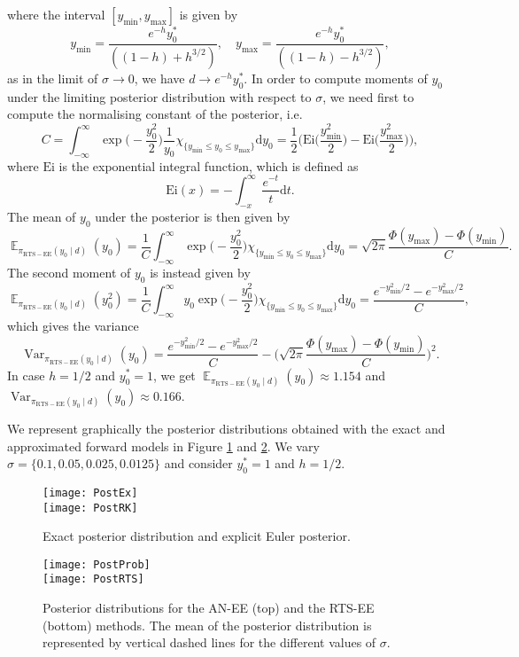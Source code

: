 \documentclass{siamart1116}
\numberwithin{theorem}{section}
\newcommand{\Var}{\operatorname{Var}}
\newcommand{\E}{\operatorname{\mathbb{E}}}
\newcommand{\dd}{\mathrm{d}}
\begin{document}
where the interval $[y_{\min}, y_{\max}]$ is given by
\[
	y_{\min} = \frac{e^{-h}y_0^*}{((1 - h) + h^{3/2})}, \quad y_{\max} = \frac{e^{-h}y_0^*}{((1 - h) - h^{3/2})},
\]
as in the limit of $\sigma \to 0$, we have $d \to e^{-h}y_0^*$. In order to compute moments of $y_0$ under the limiting posterior distribution with respect to $\sigma$, we need first to compute the normalising constant of the posterior, i.e.
\[
	C = \int_{-\infty}^{\infty} \exp\Big(-\frac{y_0^2}{2}\Big)\frac{1}{y_0} \chi_{\{y_{\min} \leq y_0 \leq y_{\max}\}} \dd y_0 = \frac{1}{2}\Big(\mathrm{Ei}\big(\frac{y_{\min}^2}{2}\big) - \mathrm{Ei}\big(\frac{y_{\max}^2}{2}\big)\Big),
\]
where $\mathrm{Ei}$ is the exponential integral function, which is defined as
\[
	\mathrm{Ei}(x) = - \int_{-x}^{\infty} \frac{e^{-t}}{t} \dd t.
\]
The mean of $y_0$ under the posterior is then given by
\[
	\E_{\pi_{\mathrm{RTS-EE}}(y_0 \mid d)} (y_0) = \frac{1}{C} \int_{-\infty}^{\infty}\exp\Big(-\frac{y_0^2}{2}\Big)\chi_{\{y_{\min} \leq y_0 \leq y_{\max}\}} \dd y_0 = \sqrt{2\pi}\frac{\Phi(y_{\max}) - \Phi(y_{\min})}{C}.
\]
The second moment of $y_0$ is instead given by
\[
	\E_{\pi_{\mathrm{RTS-EE}}(y_0 \mid d)} (y_0^2) = \frac{1}{C} \int_{-\infty}^{\infty} y_0 \exp\Big(-\frac{y_0^2}{2}\Big)\chi_{\{y_{\min} \leq y_0 \leq y_{\max}\}} \dd y_0 = \frac{e^{-y_{\min}^2/2} - e^{-y_{\max}^2/2}}{C},
\]
which gives the variance
\[
	\Var_{\pi_{\mathrm{RTS-EE}}(y_0 \mid d)} (y_0) = \frac{e^{-y_{\min}^2/2} - e^{-y_{\max}^2/2}}{C} - \Big(\sqrt{2\pi}\frac{\Phi(y_{\max}) - \Phi(y_{\min})}{C}\Big)^2.
\]
In case $h = 1/2$ and $y_0^* = 1$, we get $\E_{\pi_{\mathrm{RTS-EE}}(y_0 \mid d)} (y_0) \approx 1.154$ and $\Var_{\pi_{\mathrm{RTS-EE}}(y_0 \mid d)} (y_0) \approx 0.166$.

We represent graphically the posterior distributions obtained with the exact and approximated forward models in Figure \ref{fig:ExactRK} and \ref{fig:Prob}. We vary $\sigma = \{0.1, 0.05, 0.025, 0.0125\}$ and consider $y_0^* = 1$ and $h = 1/2$.
\begin{figure}
	\centering
	\texttt{[image: PostEx]} \\
	\texttt{[image: PostRK]}
	\caption{Exact posterior distribution and explicit Euler posterior.}
	\label{fig:ExactRK}
\end{figure}

\begin{figure}
	\centering
	\texttt{[image: PostProb]} \\
	\texttt{[image: PostRTS]}
	\caption{Posterior distributions for the AN-EE (top) and the RTS-EE (bottom) methods. The mean of the posterior distribution is represented by vertical dashed lines for the different values of $\sigma$.}
	\label{fig:Prob}
\end{figure}
\end{document}
